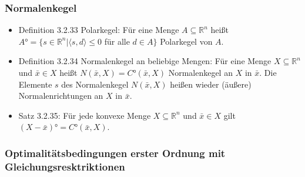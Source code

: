 \documentclass[paper=a4, fontsize=11pt]{scrartcl} %
\numberwithin{equation}{section} %
\numberwithin{figure}{section} %
\numberwithin{table}{section} %
\begin{document}
\subsubsection{Normalenkegel}

\begin{itemize}
  \item Definition 3.2.33 Polarkegel: Für eine Menge $A \subseteq \mathbb{R}^n$ heißt $A° = \{ s \in \mathbb{R}^n | \langle s,d\rangle \le 0$ für alle $d \in A\}$ Polarkegel von $A$.
  \item Definition 3.2.34 Normalenkegel an beliebige Mengen: Für eine Menge $X \subseteq \mathbb{R}^n$ und $\bar{x} \in X$ heißt $N(\bar{x},X) = C°(\bar{x},X)$ Normalenkegel an $X$ in $\bar{x}$. Die Elemente $s$ des Normalenkegel $N(\bar{x},X)$ heißen wieder (äußere) Normalenrichtungen an $X$ in $\bar{x}$.
  \item Satz 3.2.35: Für jede konvexe Menge $X \subseteq \mathbb{R}^n$ und $\bar{x} \in X$ gilt $(X - \bar{x})° = C°(\bar{x},X)$.
\end{itemize}

\subsubsection{Optimalitätsbedingungen erster Ordnung mit Gleichungsresktriktionen}
\end{document}
